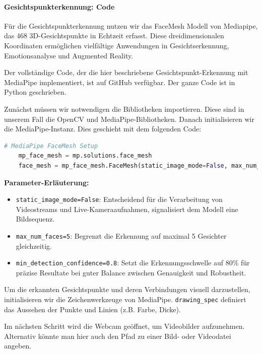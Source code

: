 \paragraph{Gesichtspunkterkennung: Code} 

Für die Gesichtspunkterkennung nutzen wir das FaceMesh Modell von Mediapipe, das 468 3D-Gesichtspunkte in Echtzeit erfasst. Diese dreidimensionalen Koordinaten ermöglichen vielfältige Anwendungen in Gesichtserkennung, Emotionsanalyse und Augmented Reality.

Der vollständige Code, der die hier beschriebene Gesichtspunkt-Erkennung mit MediaPipe implementiert, ist auf GitHub \cite{github_yolo} verfügbar.
Der ganze Code ist in Python geschrieben.

Zunächst müssen wir notwendigen die Bibliotheken importieren. Diese sind in unserem Fall die OpenCV und MediaPipe-Bibliotheken.
Danach initialisieren wir die MediaPipe-Instanz. Dies geschieht mit dem folgenden Code:
\begin{lstlisting}[language=Python, caption={Initialisierung FaceMesh}, label={lst:mediapipe_facemesh}, inputencoding=utf8]
    # MediaPipe FaceMesh Setup
    mp_face_mesh = mp.solutions.face_mesh
    face_mesh = mp_face_mesh.FaceMesh(static_image_mode=False, max_num_faces=5, min_detection_confidence=0.8)
\end{lstlisting}

\textbf{Parameter-Erläuterung:}
\begin{itemize}
    \item \texttt{static\_image\_mode=False}: Entscheidend für die Verarbeitung von Videostreams und Live-Kameraaufnahmen, signalisiert dem Modell eine Bildsequenz.
    \item \texttt{max\_num\_faces=5}: Begrenzt die Erkennung auf maximal 5 Gesichter gleichzeitig.
    \item \texttt{min\_detection\_confidence=0.8}: Setzt die Erkennungsschwelle auf 80\% für präzise Resultate bei guter Balance zwischen Genauigkeit und Robustheit.
\end{itemize}

Um die erkannten Gesichtspunkte und deren Verbindungen visuell darzustellen, initialisieren wir die Zeichenwerkzeuge von MediaPipe. \texttt{drawing\_spec} definiert das Aussehen der Punkte und Linien (z.B. Farbe, Dicke).

Im nächsten Schritt wird die Webcam geöffnet, um Videobilder aufzunehmen. Alternativ könnte man hier auch den Pfad zu einer Bild- oder Videodatei angeben. 

